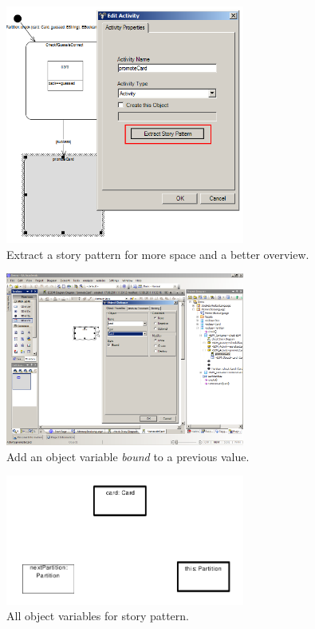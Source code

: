 \begin{figure}[htp]
\begin{center}
  \includegraphics[width=0.7\textwidth]{pics/sdmBilder/check/sdm21}
  \caption{Extract a story pattern for more space and a better overview.}  
  \label{fig:sdm_check_extract_storypattern}
\end{center}
\end{figure}

\begin{figure}[htp]
\begin{center}
  \includegraphics[width=0.7\textwidth]{pics/sdmBilder/check/sdm22RAW}
  \caption{Add an object variable \emph{bound} to a previous value.}  
  \label{fig:sdm_check_bound_card}
\end{center}
\end{figure}

\begin{figure}[htp]
\begin{center}
  \includegraphics[width=0.7\textwidth]{pics/sdmBilder/check/sdm25}
  \caption{All object variables for story pattern.}  
  \label{fig:sdm_check_complete_sp}
\end{center}
\end{figure}

